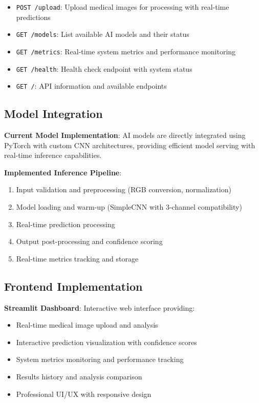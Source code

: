 \documentclass[12pt,a4paper]{article}
\begin{document}
\begin{itemize}
    \item \texttt{POST /upload}: Upload medical images for processing with real-time predictions
    \item \texttt{GET /models}: List available AI models and their status
    \item \texttt{GET /metrics}: Real-time system metrics and performance monitoring
    \item \texttt{GET /health}: Health check endpoint with system status
    \item \texttt{GET /}: API information and available endpoints
\end{itemize}

\subsection{Model Integration}

\textbf{Current Model Implementation}: AI models are directly integrated using PyTorch with custom CNN architectures, providing efficient model serving with real-time inference capabilities.

\textbf{Implemented Inference Pipeline}:
\begin{enumerate}
    \item Input validation and preprocessing (RGB conversion, normalization)
    \item Model loading and warm-up (SimpleCNN with 3-channel compatibility)
    \item Real-time prediction processing
    \item Output post-processing and confidence scoring
    \item Real-time metrics tracking and storage
\end{enumerate}

\subsection{Frontend Implementation}

\textbf{Streamlit Dashboard}: Interactive web interface providing:
\begin{itemize}
    \item Real-time medical image upload and analysis
    \item Interactive prediction visualization with confidence scores
    \item System metrics monitoring and performance tracking
    \item Results history and analysis comparison
    \item Professional UI/UX with responsive design
\end{itemize}
\end{document}
